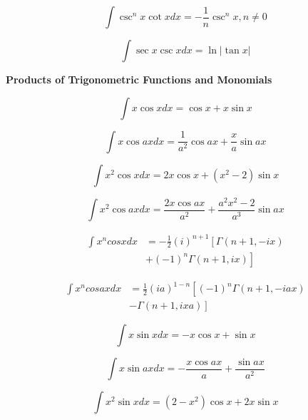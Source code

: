 \documentclass[11pt,twoside]{article}
\begin{document}
\begin{multicols}{3}
\begin{footnotesize}
\begin{equation}
\int \csc^nx \cot x dx = -\frac{1}{n}\csc^n x, n\ne 0
\end{equation}

\begin{equation}
\int \sec x \csc x dx = \ln | \tan x |
\end{equation}


\begin{center} \textbf{Products of Trigonometric Functions and Monomials} \end{center}

\begin{equation}
\int x \cos x dx = \cos x + x \sin x
\end{equation}

\begin{equation}
\int x \cos ax dx = \frac{1}{a^2} \cos ax + \frac{x}{a} \sin ax
\end{equation}

\begin{equation}
\int x^2 \cos x dx = 2 x \cos x + \left ( x^2 - 2 \right ) \sin x
\end{equation}

\begin{equation}
\int x^2 \cos ax dx = \frac{2 x \cos ax }{a^2} + \frac{ a^2 x^2 - 2  }{a^3} \sin ax
\end{equation}

\begin{align}
\int  x^n cos x dx &=
-\frac{1}{2}(i)^{n+1}\left [ \Gamma(n+1, -ix)
\right . \nonumber \\ & \left .
+ (-1)^n \Gamma(n+1, ix)\right]
\end{align}

\begin{align}
\int x^n cos ax dx &=
 \frac{1}{2}(ia)^{1-n}\left [ (-1)^n  \Gamma(n+1, -iax)
 \right. \nonumber \\ & \left.
 -\Gamma(n+1, ixa)\right]
\end{align}

\begin{equation}
\int x \sin x dx = -x \cos x + \sin x
\end{equation}

\begin{equation}
\int x \sin ax dx = -\frac{x \cos ax}{a} + \frac{\sin ax}{a^2}
\end{equation}

\begin{equation}
\int x^2 \sin x dx = \left(2-x^2\right) \cos x + 2 x \sin x
\end{equation}


\end{footnotesize}
\end{multicols}
\end{document}
